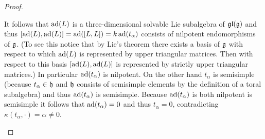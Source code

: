 \begin{proof}
\begin{enumerate}[leftmargin=*]
   It follows that $\operatorname{ad}(L)$ is a three-dimensional solvable Lie subalgebra of $\mathfrak{gl}(\mathfrak{g})$ and thus $[\operatorname{ad}(L), \operatorname{ad}(L)] = \operatorname{ad}([L,L]) = k \operatorname{ad}(t_\alpha)$ consists of nilpotent endomorphisms of $\mathfrak{g}$. (To see this notice that by Lie’s theorem there exists a basis of $\mathfrak{g}$ with respect to which $\operatorname{ad}(L)$ is represented by upper triangular matrices. Then with respect to this basis $[\operatorname{ad}(L), \operatorname{ad}(L)]$ is represented by strictly upper triangular matrices.) In particular $\operatorname{ad}(t_\alpha)$ is nilpotent. On the other hand $t_\alpha$ is semisimple (because $t_\alpha \in \mathfrak{h}$ and $\mathfrak{h}$ consists of semisimple elements by the definition of a toral subalgebra) and thus $\operatorname{ad}(t_\alpha)$ is semisimple. Because $\operatorname{ad}(t_\alpha)$ is both nilpotent is semisimple it follows that $\operatorname{ad}(t_\alpha) = 0$ and thus $t_\alpha = 0$, contradicting $\kappa(t_\alpha, \cdot) = \alpha \neq 0$.
  \qedhere
 \end{enumerate}
\end{proof}






















